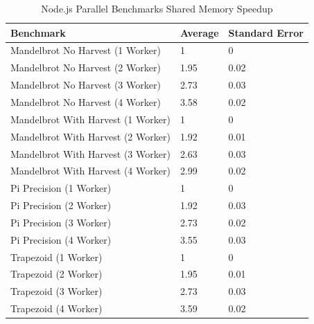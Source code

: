 \documentclass[oneside]{um-fict}
\begin{document}
\begin{table}[H]
    \begin{center}
        \begin{tabular}{|l|ll|}
        \hline
        Benchmark                  & Average & Standard Error \\ \hline
        Mandelbrot No Harvest (1 Worker)   & 1       & 0              \\
        Mandelbrot No Harvest (2 Worker)   & 1.95    & 0.02           \\
        Mandelbrot No Harvest (3 Worker)   & 2.73    & 0.03           \\
        Mandelbrot No Harvest (4 Worker)   & 3.58    & 0.02           \\
        Mandelbrot With Harvest (1 Worker) & 1       & 0              \\
        Mandelbrot With Harvest (2 Worker) & 1.92    & 0.01           \\
        Mandelbrot With Harvest (3 Worker) & 2.63    & 0.03           \\
        Mandelbrot With Harvest (4 Worker) & 2.99    & 0.02           \\
        Pi Precision (1 Worker)            & 1       & 0              \\
        Pi Precision (2 Worker)            & 1.92    & 0.03           \\
        Pi Precision (3 Worker)            & 2.73    & 0.02           \\
        Pi Precision (4 Worker)            & 3.55    & 0.03           \\
        Trapezoid (1 Worker)               & 1       & 0              \\
        Trapezoid (2 Worker)               & 1.95    & 0.01           \\
        Trapezoid (3 Worker)               & 2.73    & 0.03           \\
        Trapezoid (4 Worker)               & 3.59    & 0.02           \\ \hline
        \end{tabular}
        \caption{Node.js Parallel Benchmarks Shared Memory Speedup}\label{tab:nodesharedmemoryspeedup}
    \end{center}
\end{table}
\end{document}
